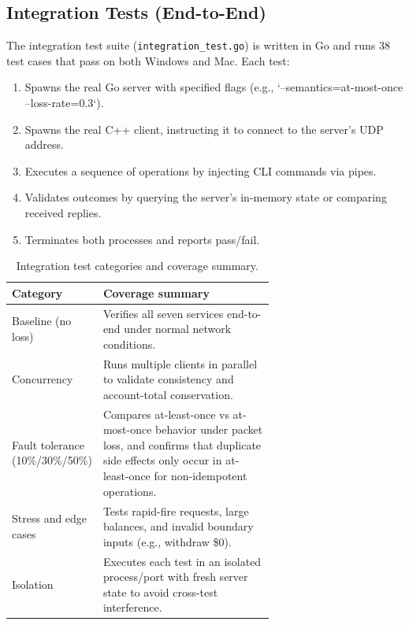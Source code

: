 \documentclass[9pt,a4paper]{article}
\begin{document}
\subsection{Integration Tests (End-to-End)}

The integration test suite (\texttt{integration\_test.go}) is written in Go and runs 38 test cases that pass on both Windows and Mac. Each test:

\begin{enumerate}
    \item Spawns the real Go server with specified flags (e.g., `--semantics=at-most-once --loss-rate=0.3`).
    \item Spawns the real C++ client, instructing it to connect to the server's UDP address.
    \item Executes a sequence of operations by injecting CLI commands via pipes.
    \item Validates outcomes by querying the server's in-memory state or comparing received replies.
    \item Terminates both processes and reports pass/fail.
\end{enumerate}

\begin{table}[H]
\centering
\caption{Integration test categories and coverage summary.}
\label{tab:integration-test-categories}
\begin{tabular}{l p{0.66\linewidth}}
\toprule
\textbf{Category} & \textbf{Coverage summary} \\
\midrule
Baseline (no loss) & Verifies all seven services end-to-end under normal network conditions. \\
Concurrency & Runs multiple clients in parallel to validate consistency and account-total conservation. \\
Fault tolerance (10\%/30\%/50\%) & Compares at-least-once vs at-most-once behavior under packet loss, and confirms that duplicate side effects only occur in at-least-once for non-idempotent operations. \\
Stress and edge cases & Tests rapid-fire requests, large balances, and invalid boundary inputs (e.g., withdraw \$0). \\
Isolation & Executes each test in an isolated process/port with fresh server state to avoid cross-test interference. \\
\bottomrule
\end{tabular}
\end{table}

\end{document}
